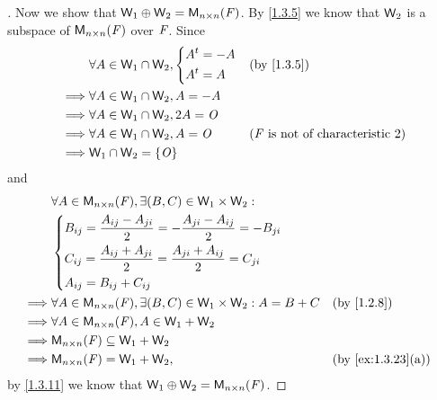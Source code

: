 \begin{proof}[]
  Now we show that \(\W_1 \oplus \W_2 = \ms[n][n][\F]\).
  By \cref{1.3.5} we know that \(\mathsf{W}_2\) is a subspace of \(\ms[n][n][\F]\) over \(\mathit{F}\).
  Since
  \begin{align*}
             & \forall A \in \W_1 \cap \W_2, \begin{dcases}
                                               \tp{A} = -A \\
                                               \tp{A} = A
                                             \end{dcases} &  & \by{1.3.5}                                       \\
    \implies & \forall A \in \W_1 \cap \W_2, A = -A                                                             \\
    \implies & \forall A \in \W_1 \cap \W_2, 2A = \zm                                                           \\
    \implies & \forall A \in \W_1 \cap \W_2, A = \zm        &  & \text{(\(\F\) is not of characteristic \(2\))} \\
    \implies & \W_1 \cap \W_2 = \set{\zm}
  \end{align*}
  and
  \begin{align*}
             & \forall A \in \ms[n][n][\F], \exists (B, C) \in \W_1 \times \W_2 :                                                                                                                                       \\
             & \begin{dcases}
                 B_{i j} = \dfrac{A_{i j} - A_{j i}}{2} = - \dfrac{A_{j i} - A_{i j}}{2} = -B_{j i} \\
                 C_{i j} = \dfrac{A_{i j} + A_{j i}}{2} = \dfrac{A_{j i} + A_{i j}}{2} = C_{j i}    \\
                 A_{i j} = B_{i j} + C_{i j}
               \end{dcases}                           \\
    \implies & \forall A \in \ms[n][n][\F], \exists (B, C) \in \W_1 \times \W_2 : A = B + C                                                                                                      &  & \by{1.2.8}        \\
    \implies & \forall A \in \ms[n][n][\F], A \in \W_1 + \W_2                                                                                                                                                           \\
    \implies & \ms[n][n][\F] \subseteq \W_1 + \W_2                                                                                                                                                                      \\
    \implies & \ms[n][n][\F] = \W_1 + \W_2,                                                                                                                                                      &  & \by{ex:1.3.23}[a]
  \end{align*}
  by \cref{1.3.11} we know that \(\W_1 \oplus \W_2 = \ms[n][n][\F]\).
\end{proof}

